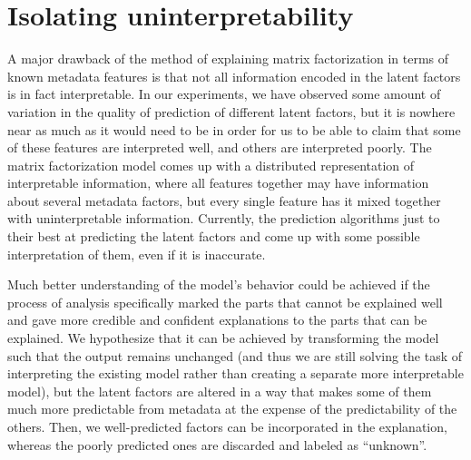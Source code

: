 \chapter{Isolating uninterpretability}

A major drawback of the method of explaining matrix factorization in terms of
known metadata features is that not all information encoded in the latent
factors is in fact interpretable. In our experiments, we have observed some
amount of variation in the quality of prediction of different latent factors,
but it is nowhere near as much as it would need to be in order for us to be able
to claim that some of these features are interpreted well, and others are
interpreted poorly. The matrix factorization model comes up with a distributed
representation of interpretable information, where all features together may
have information about several metadata factors, but every single feature has it
mixed together with uninterpretable information. Currently, the prediction
algorithms just to their best at predicting the latent factors and come up with
some possible interpretation of them, even if it is inaccurate.

Much better understanding of the model's behavior could be achieved if the
process of analysis specifically marked the parts that cannot be explained well
and gave more credible and confident explanations to the parts that can be
explained. We hypothesize that it can be achieved by transforming the model such
that the output remains unchanged (and thus we are still solving the task of
interpreting the existing model rather than creating a separate more
interpretable model), but the latent factors are altered in a way that makes
some of them much more predictable from metadata at the expense of the
predictability of the others. Then, we well-predicted factors can be
incorporated in the explanation, whereas the poorly predicted ones are discarded
and labeled as ``unknown''.

